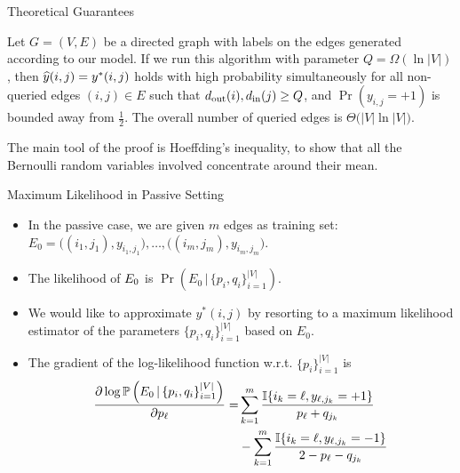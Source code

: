 \documentclass[10pt,svgnames,ignorenonframetext,final]{beamer}
\providecommand{\largelist}{%
  \setlength{\itemsep}{8pt}\setlength{\parskip}{3pt}}
\begin{document}
\begin{frame}{Theoretical Guarantees}

\begin{theorem}\label{t:active}
Let $G = (V, E)$ be a directed graph with labels on the edges generated according to our model.
If we run this algorithm with parameter $Q = \Omega(\ln|V|)$, then
\alert{$\widehat{y}(i,j) = y^*(i,j)$ holds with high probability simultaneously for all non-queried edges $(i,j)
\in E$} such that $d_{\mathrm{out}}(i),d_{\mathrm{in}}(j) \ge Q$, and $\Pr(y_{i,j}=+1)$ is bounded away from
$\tfrac{1}{2}$.
The overall number of queried edges is $\Theta\big(|V|\ln|V|\big)$.
\end{theorem}

The main tool of the proof is Hoeffding's inequality, to show that all the Bernoulli random
variables involved concentrate around their mean.


\end{frame}

\begin{frame}{Maximum Likelihood in Passive Setting}

  \begin{itemize}[<+->]
    \largelist
    \item 
In the passive case, we are given $m$ edges as training set: \(E_0 = \big((i_1,j_1),y_{i_1,j_1}),
\ldots, ((i_m,j_m),y_{i_m,j_m}\big)\).

    \item 
The likelihood of $E_0$ is $\Pr\left(E_0\,|\, \{p_i, q_i\}_{i=1}^{|V|}\right)$.

    \item 
      We would like to \alert{approximate \(y^*(i,j)\)} by resorting to a maximum
likelihood estimator of the parameters \(\{p_i, q_i\}_{i=1}^{|V|}\)
based on \(E_0\).

    \item 
The gradient of the log-likelihood function w.r.t.
\(\{p_i\}_{i=1}^{|V|}\) is
\vspace{-4pt}
\begin{align*}
\frac{\partial \log \mathbb{P}\left(E_0\,|\, \{p_i, q_i\}_{i=1}^{|V|}\right)}{\partial p_{\ell}}
= 
&\sum_{k=1}^m
\frac{\mathbb{I}\!\left\{{i_k = \ell,y_{\ell,j_k}=+1}\right\}}{p_{\ell}+q_{j_k}} \\
&-
\sum_{k=1}^m
\frac{\mathbb{I}\!\left\{{i_k = \ell,y_{\ell,j_k}=-1}\right\}}{2-p_{\ell}-q_{j_k}}
\end{align*}
  \end{itemize}

\end{frame}
\end{document}
